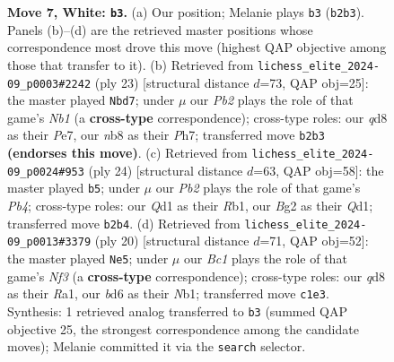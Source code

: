 \documentclass[11pt]{article}
\begin{document}
\begin{figure}[p]
\caption{\textbf{Move 7, White: \texttt{b3}.} (a) Our position; Melanie plays \texttt{b3} (\texttt{b2b3}). Panels (b)--(d) are the retrieved master positions whose correspondence most drove this move (highest QAP objective among those that transfer to it). (b) Retrieved from \texttt{lichess\_elite\_2024-09\_p0003\#2242} (ply 23) [structural distance $d$=73, QAP obj=25]: the master played \texttt{Nbd7}; under $\mu$ our \emph{Pb2} plays the role of that game's \emph{Nb1} (a \textbf{cross-type} correspondence); cross-type roles: our \emph{q}d8 as their \emph{P}e7, our \emph{n}b8 as their \emph{P}h7; transferred move \texttt{b2b3} \textbf{(endorses this move)}. (c) Retrieved from \texttt{lichess\_elite\_2024-09\_p0024\#953} (ply 24) [structural distance $d$=63, QAP obj=58]: the master played \texttt{b5}; under $\mu$ our \emph{Pb2} plays the role of that game's \emph{Pb4}; cross-type roles: our \emph{Q}d1 as their \emph{R}b1, our \emph{B}g2 as their \emph{Q}d1; transferred move \texttt{b2b4}. (d) Retrieved from \texttt{lichess\_elite\_2024-09\_p0013\#3379} (ply 20) [structural distance $d$=71, QAP obj=52]: the master played \texttt{Ne5}; under $\mu$ our \emph{Bc1} plays the role of that game's \emph{Nf3} (a \textbf{cross-type} correspondence); cross-type roles: our \emph{q}d8 as their \emph{R}a1, our \emph{b}d6 as their \emph{N}b1; transferred move \texttt{c1e3}. Synthesis: 1 retrieved analog transferred to \texttt{b3} (summed QAP objective 25, the strongest correspondence among the candidate moves); Melanie committed it via the \texttt{search} selector.}
\label{fig:thought-m12}
\end{figure}

\clearpage
\end{document}
